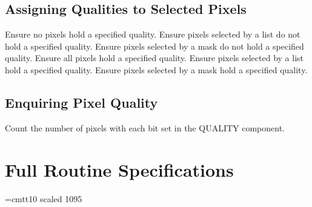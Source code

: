 \subsection{Assigning Qualities to Selected Pixels}
   {Ensure no pixels hold a specified quality.}
   {Ensure pixels selected by a list do not hold a specified quality.}
   {Ensure pixels selected by a mask do not hold a specified quality.}
   {Ensure all pixels hold a specified quality.}
   {Ensure pixels selected by a list hold a specified quality.}
   {Ensure pixels selected by a mask hold a specified quality.}

\subsection{Enquiring Pixel Quality}
   {Count the number of pixels with each bit set in the QUALITY component.}

\section {Full Routine Specifications}
\label {SEC:FULLSPEC}
\newlength{\sstbannerlength}
\newlength{\sstcaptionlength}
\font\ssttt=cmtt10 scaled 1095
\newcommand{\sstroutine}[3]{
   \goodbreak
   \rule{\textwidth}{0.5mm}
   \vspace{-7ex}
   \newline
   \settowidth{\sstbannerlength}{{\Large {\bf #1}}}
   \setlength{\sstcaptionlength}{\textwidth}
   \addtolength{\sstbannerlength}{0.5em} 
   \addtolength{\sstcaptionlength}{-2.0\sstbannerlength}
   \addtolength{\sstcaptionlength}{-4.45pt}
   \parbox[t]{\sstbannerlength}{\flushleft{\Large {\bf #1}}}
   \parbox[t]{\sstcaptionlength}{\center{\Large #2}}
   \parbox[t]{\sstbannerlength}{\flushright{\Large {\bf #1}}}
   \begin{description}
      #3
   \end{description}
}

\newcommand{\sstdescription}[1]{\item[Description:] #1}

\newcommand{\sstusage}[1]{\item[Usage:] \mbox{} \\[1.3ex] {\ssttt #1}}

